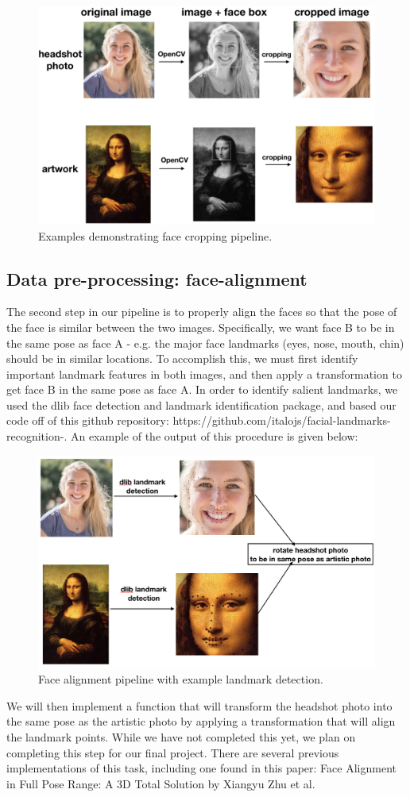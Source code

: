 \documentclass{pnastwo2}
\begin{document}
\begin{article}
\begin{figure}[ht]
	\begin{center}
		\includegraphics[width=.45\textwidth]{face_crop_figure}
		\caption{Examples demonstrating face cropping pipeline.} \label{fig:face_crop}
	\end{center}
\end{figure} 

\subsection{Data pre-processing: face-alignment}

The second step in our pipeline is to properly align the faces so that the pose of the face is similar between the two images. Specifically, we want face B to be in the same pose as face A - e.g. the major face landmarks (eyes, nose, mouth, chin) should be in similar locations. To accomplish this, we must first identify important landmark features in both images, and then apply a transformation to get face B in the same pose as face A. In order to identify salient landmarks, we used the dlib face detection and landmark identification package, and based our code off of this github repository: https://github.com/italojs/facial-landmarks-recognition-. An example of the output of this procedure is given below:

\begin{figure}[ht]
	\begin{center}
		\includegraphics[width=.4\textwidth]{landmark_id}
		\caption{Face alignment pipeline with example landmark detection.} \label{fig:nst}
	\end{center}
\end{figure} 

We will then implement a function that will transform the headshot photo into the same pose as the artistic photo by applying a transformation that will align the landmark points. While we have not completed this yet, we plan on completing this step for our final project. There are several previous implementations of this task, including one found in this paper: Face Alignment in Full Pose Range: A 3D Total Solution by Xiangyu Zhu et al. 


\end{article}
\end{document}
